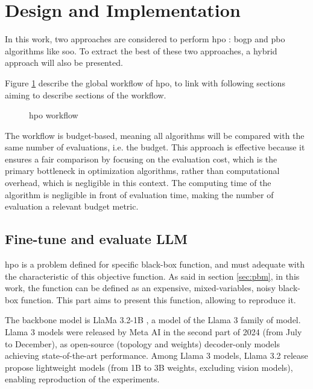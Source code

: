 \section{Design and Implementation}
\label{sec:methodo}
In this work, two approaches are considered to perform \acrfull{hpo} : \acrfull{bogp} and \acrfull{pbo} algorithms like \acrfull{soo}\cite{munos_optimistic_2011}. To extract the best of these two approaches, a hybrid approach will also be presented.

Figure \ref{fig:workflow} describe the global workflow of \acrfull{hpo}, to link with following sections aiming to describe sections of the workflow. 

\begin{figure}
    \centering
    
    \caption{ \acrshort{hpo} workflow}
    \label{fig:workflow}
\end{figure}\vspace*{-\baselineskip}

The workflow is budget-based, meaning all algorithms will be compared with the same number of evaluations, i.e. the budget. This approach is effective because it ensures a fair comparison by focusing on the evaluation cost, which is the primary bottleneck in optimization algorithms, rather than computational overhead, which is negligible in this context. The computing time of the algorithm is negligible in front of evaluation time, making the number of evaluation a relevant budget metric. 

\subsection{Fine-tune and evaluate LLM}
\label{sec:llm}
\acrshort{hpo} is a problem defined for specific black-box function, and must adequate with the characteristic of this objective function. As said in section \ref{sec:pbm}, in this work, the function can be defined as an expensive, mixed-variables, noisy black-box function. This part aims to present this function, allowing to reproduce it. 

The backbone model is LlaMa 3.2-1B \cite{grattafiori_llama_2024}, a model of the Llama 3 family of model. Llama 3 models were released by Meta AI in the second part of 2024 (from July to December), as open-source (topology and weights) decoder-only models achieving state-of-the-art performance. Among Llama 3 models, Llama 3.2 release propose lightweight models (from 1B to 3B weights, excluding vision models), enabling reproduction of the experiments. 

